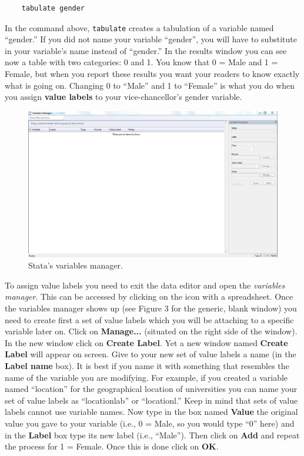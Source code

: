 \begin{lstlisting}
	tabulate gender
\end{lstlisting} 

In the command above, \texttt{tabulate} creates a tabulation of a variable named ``gender.'' If you did not name your variable ``gender'', you will have to substitute in your variable's name instead of ``gender.'' In the results window you can see now a table with two categories: 0 and 1. You know that 0 = Male and 1 = Female, but when you report these results you want your readers to know exactly what is going on. Changing 0 to ``Male'' and 1 to ``Female'' is what you do when you assign \textbf{value labels} to your vice-chancellor's gender variable.

\begin{figure}[H]
	\includegraphics[width=\linewidth]{./img/stata_variables_manager.jpg}
	\caption{Stata's variables manager.}
\end{figure}

To assign value labels you need to exit the data editor and open the \textit{variables manager}. This can be accessed by clicking on the icon with a spreadsheet. Once the variables manager shows up (see Figure 3 for the generic, blank window) you need to create first a set of value labels which you will be attaching to a specific variable later on. Click on \textbf{Manage...} (situated on the right side of the window). In the new window click on \textbf{Create Label}. Yet a new window named \textbf{Create Label} will appear on screen. Give to your new set of value labels a name (in the \textbf{Label name} box). It is best if you name it with something that resembles the name of the variable you are modifying. For example, if you created a variable named ``location'' for the geographical location of universities you can name your set of value labels as ``locationlab'' or ``locationl.'' Keep in mind that sets of value labels cannot use variable names. Now type in the box named \textbf{Value} the original value you gave to your variable (i.e., 0 = Male, so you would type ``0'' here) and in the \textbf{Label} box type its new label (i.e., ``Male''). Then click on \textbf{Add} and repeat the process for 1 = Female. Once this is done click on \textbf{OK}.


